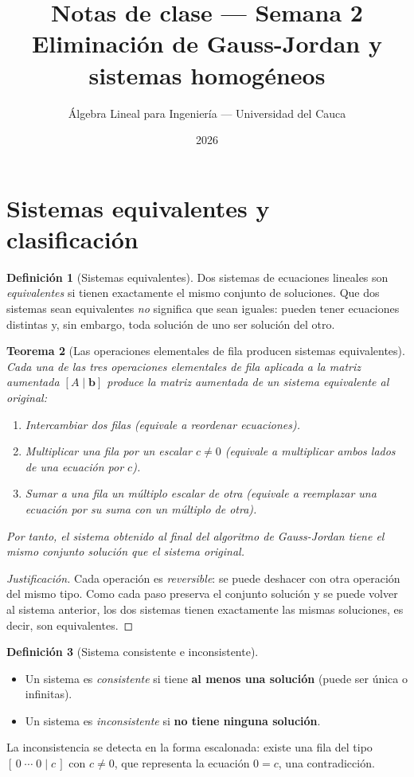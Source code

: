 \documentclass[11pt,letterpaper]{article}
\title{\textcolor{unicaucaverde}{\Large Notas de clase --- Semana 2}\\[4pt]
  \large Eliminación de Gauss-Jordan y sistemas homogéneos}
\author{Álgebra Lineal para Ingeniería --- Universidad del Cauca}
\date{2026}
\theoremstyle{definition}
\newtheorem{definicion}{Definición}[section]
\theoremstyle{plain}
\newtheorem{teorema}[definicion]{Teorema}
\newcommand{\vv}[1]{\mathbf{#1}}
\begin{document}
\maketitle
\tableofcontents

\section{Sistemas equivalentes y clasificación}

\begin{definicion}[Sistemas equivalentes]
Dos sistemas de ecuaciones lineales son \emph{equivalentes} si tienen exactamente el mismo
conjunto de soluciones. Que dos sistemas sean equivalentes \emph{no} significa que sean iguales:
pueden tener ecuaciones distintas y, sin embargo, toda solución de uno ser solución del otro.
\end{definicion}

\begin{teorema}[Las operaciones elementales de fila producen sistemas equivalentes]\label{teo:equiv}
Cada una de las tres operaciones elementales de fila aplicada a la matriz aumentada
$[A\mid\vv{b}]$ produce la matriz aumentada de un sistema equivalente al original:
\begin{enumerate}[label=(\roman*)]
  \item Intercambiar dos filas (equivale a reordenar ecuaciones).
  \item Multiplicar una fila por un escalar $c\neq 0$ (equivale a multiplicar ambos lados de una
        ecuación por $c$).
  \item Sumar a una fila un múltiplo escalar de otra (equivale a reemplazar una ecuación por su
        suma con un múltiplo de otra).
\end{enumerate}
Por tanto, el sistema obtenido al final del algoritmo de Gauss-Jordan tiene el mismo conjunto
solución que el sistema original.
\end{teorema}

\begin{proof}[Justificación]
Cada operación es \emph{reversible}: se puede deshacer con otra operación del mismo tipo. Como
cada paso preserva el conjunto solución y se puede volver al sistema anterior, los dos sistemas
tienen exactamente las mismas soluciones, es decir, son equivalentes.
\end{proof}

\begin{definicion}[Sistema consistente e inconsistente]
\begin{itemize}
  \item Un sistema es \emph{consistente} si tiene \textbf{al menos una solución} (puede ser única
        o infinitas).
  \item Un sistema es \emph{inconsistente} si \textbf{no tiene ninguna solución}.
\end{itemize}
La inconsistencia se detecta en la forma escalonada: existe una fila del tipo
$[\,0\;\cdots\;0\mid c\,]$ con $c\neq 0$, que representa la ecuación $0=c$, una contradicción.
\end{definicion}
\end{document}
